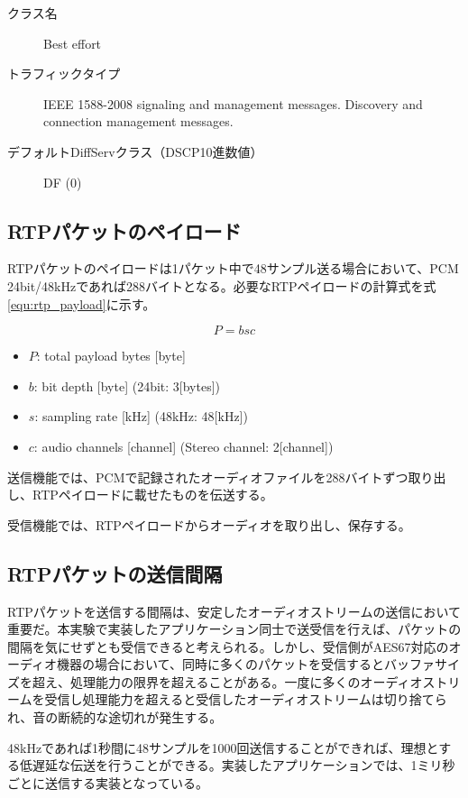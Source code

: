 \hrulefill

\begin{description}
  \item[クラス名] Best effort
  \item[トラフィックタイプ] IEEE 1588-2008 signaling and management messages. Discovery and connection management messages.
  \item[デフォルトDiffServクラス（DSCP10進数値）] DF (0)
\end{description}

\subsection{RTPパケットのペイロード}

RTPパケットのペイロードは1パケット中で48サンプル送る場合において、PCM 24bit/48kHzであれば288バイトとなる\cite{aes67-pcap}。必要なRTPペイロードの計算式を式\ref{equ:rtp_payload}に示す。

\begin{equation}
  \label{equ:rtp_payload}
  P = bsc
\end{equation}
\begin{itemize}
  \item $P$: total payload bytes [byte]
  \item $b$: bit depth [byte] (24bit: 3[bytes])
  \item $s$: sampling rate [kHz] (48kHz: 48[kHz])
  \item $c$: audio channels [channel] (Stereo channel: 2[channel])
\end{itemize}

送信機能では、PCMで記録されたオーディオファイルを288バイトずつ取り出し、RTPペイロードに載せたものを伝送する。

受信機能では、RTPペイロードからオーディオを取り出し、保存する。

\subsection{RTPパケットの送信間隔}

RTPパケットを送信する間隔は、安定したオーディオストリームの送信において重要だ。本実験で実装したアプリケーション同士で送受信を行えば、パケットの間隔を気にせずとも受信できると考えられる。しかし、受信側がAES67対応のオーディオ機器の場合において、同時に多くのパケットを受信するとバッファサイズを超え、処理能力の限界を超えることがある。一度に多くのオーディオストリームを受信し処理能力を超えると受信したオーディオストリームは切り捨てられ、音の断続的な途切れが発生する。

48kHzであれば1秒間に48サンプルを1000回送信することができれば、理想とする低遅延な伝送を行うことができる。実装したアプリケーションでは、1ミリ秒ごとに送信する実装となっている。
